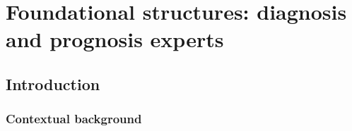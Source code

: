 
\chapter{Foundational structures: diagnosis and prognosis experts} %

\section{Introduction}
\subsection{Contextual background}

